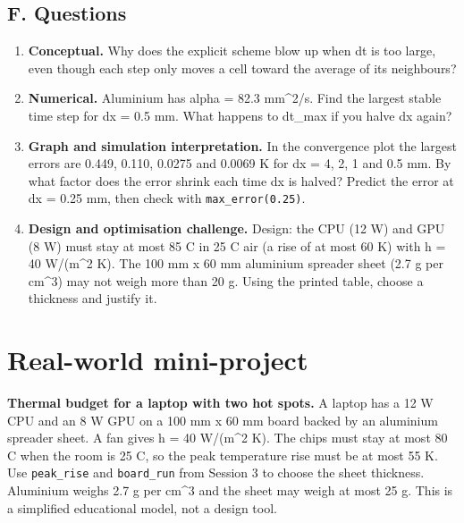 \documentclass[11pt,a4paper]{article}
\begin{document}
\subsection*{F. Questions}
\begin{enumerate}[nosep]
\item \textbf{Conceptual.} Why does the explicit scheme blow up when dt is too large, even though each step only moves a cell toward the average of its neighbours?
\item \textbf{Numerical.} Aluminium has alpha = 82.3 mm\textasciicircum{}2/s. Find the largest stable time step for dx = 0.5 mm. What happens to dt\_max if you halve dx again?
\item \textbf{Graph and simulation interpretation.} In the convergence plot the largest errors are 0.449, 0.110, 0.0275 and 0.0069 K for dx = 4, 2, 1 and 0.5 mm. By what factor does the error shrink each time dx is halved? Predict the error at dx = 0.25 mm, then check with \texttt{max\_error(0.25)}.
\item \textbf{Design and optimisation challenge.} Design: the CPU (12 W) and GPU (8 W) must stay at most 85 C in 25 C air (a rise of at most 60 K) with h = 40 W/(m\textasciicircum{}2 K). The 100 mm x 60 mm aluminium spreader sheet (2.7 g per cm\textasciicircum{}3) may not weigh more than 20 g. Using the printed table, choose a thickness and justify it.
\end{enumerate}

\section{Real-world mini-project}
\textbf{Thermal budget for a laptop with two hot spots.} A laptop has a 12 W CPU and an 8 W GPU on a 100 mm x 60 mm board backed by an aluminium spreader sheet. A fan gives h = 40 W/(m\textasciicircum{}2 K). The chips must stay at most 80 C when the room is 25 C, so the peak temperature rise must be at most 55 K. Use \texttt{peak\_rise} and \texttt{board\_run} from Session 3 to choose the sheet thickness. Aluminium weighs 2.7 g per cm\textasciicircum{}3 and the sheet may weigh at most 25 g. This is a simplified educational model, not a design tool.
\end{document}
